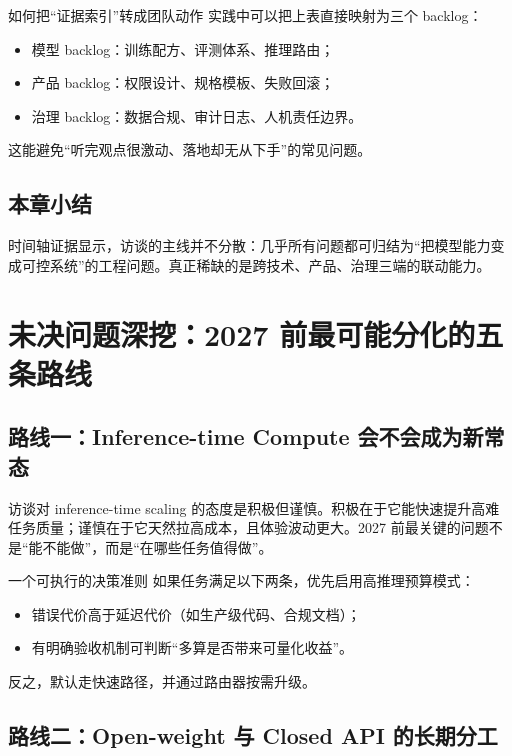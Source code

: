 \documentclass[a4paper]{article}
\begin{document}
\begin{knowledgebox}{如何把“证据索引”转成团队动作}
实践中可以把上表直接映射为三个 backlog：
\begin{itemize}[leftmargin=1.5em]
    \item 模型 backlog：训练配方、评测体系、推理路由；
    \item 产品 backlog：权限设计、规格模板、失败回滚；
    \item 治理 backlog：数据合规、审计日志、人机责任边界。
\end{itemize}
这能避免“听完观点很激动、落地却无从下手”的常见问题。
\end{knowledgebox}

\subsection{本章小结}

时间轴证据显示，访谈的主线并不分散：几乎所有问题都可归结为“把模型能力变成可控系统”的工程问题。真正稀缺的是跨技术、产品、治理三端的联动能力。

\section{未决问题深挖：2027 前最可能分化的五条路线}

\subsection{路线一：Inference-time Compute 会不会成为新常态}

访谈对 inference-time scaling 的态度是积极但谨慎。积极在于它能快速提升高难任务质量；谨慎在于它天然拉高成本，且体验波动更大。2027 前最关键的问题不是“能不能做”，而是“在哪些任务值得做”。

\begin{importantbox}{一个可执行的决策准则}
如果任务满足以下两条，优先启用高推理预算模式：
\begin{itemize}[leftmargin=1.5em]
    \item 错误代价高于延迟代价（如生产级代码、合规文档）；
    \item 有明确验收机制可判断“多算是否带来可量化收益”。
\end{itemize}
反之，默认走快速路径，并通过路由器按需升级。
\end{importantbox}

\subsection{路线二：Open-weight 与 Closed API 的长期分工}
\end{document}
